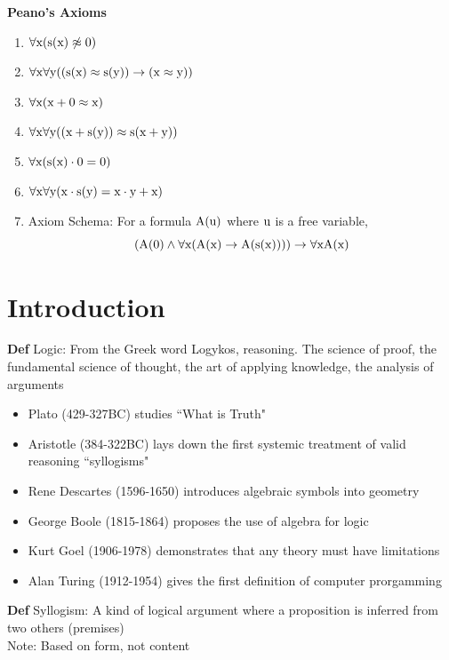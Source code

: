 \documentclass[11pt,notitlepage]{report}
\newcommand{\tbf}[1]{\textbf{#1}}
\begin{document}
\tbf{Peano's Axioms}
\vspace{-2mm}
\begin{enumerate}[label=PA\arabic*:]
    \item $\forall \rm x(s(x) \not \approx 0)$
    \item $\forall \rm x \forall y ((s(x) \approx s(y)) \to (x \approx y))$
    \item $\forall \rm x(x + 0 \approx x)$
    \item $\forall \rm x \forall y ((x + s(y)) \approx s(x+y))$
    \item $\forall \rm x(s(x) \cdot 0 = 0)$
    \item $\forall \rm x \forall y (x \cdot s(y) = x \cdot y + x)$
    \item Axiom Schema: For a formula $\rm A(u)$ where $\rm u$ is a free variable,
    $$\rm (A(0) \wedge \forall x(A(x) \to A(s(x)))) \to \forall x A(x)$$
\end{enumerate}
\newpage



\newpage

\section{Introduction}

\textbf{Def} Logic: From the Greek word Logykos, reasoning. The science of proof, the fundamental science of thought, the art of applying knowledge, the analysis of arguments

\begin{itemize}
    \item Plato (429-327BC) studies ``What is Truth"
    \item Aristotle (384-322BC) lays down the first systemic treatment of valid reasoning ``syllogisms"
    \item Rene Descartes (1596-1650) introduces algebraic symbols into geometry
    \item George Boole (1815-1864) proposes the use of algebra for logic
    \item Kurt Goel (1906-1978) demonstrates that any theory must have limitations
    \item Alan Turing (1912-1954) gives the first definition of computer prorgamming
\end{itemize}

\textbf{Def} Syllogism: A kind of logical argument where a proposition is inferred from two others (premises) \\
\hspace*{5mm} Note: Based on form, not content
\end{document}
